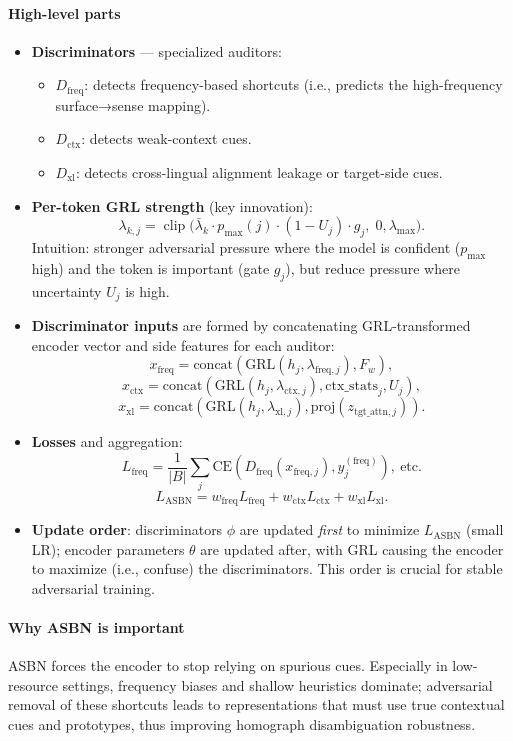 \documentclass[11pt]{article}
\begin{document}
\paragraph{High-level parts}
\begin{itemize}
  \item \textbf{Discriminators} — specialized auditors:
    \begin{itemize}
      \item $D_{\text{freq}}$: detects frequency-based shortcuts (i.e., predicts the high-frequency surface→sense mapping).
      \item $D_{\text{ctx}}$: detects weak-context cues.
      \item $D_{\text{xl}}$: detects cross-lingual alignment leakage or target-side cues.
    \end{itemize}
  \item \textbf{Per-token GRL strength} (key innovation):
    \[
    \lambda_{k,j}=\operatorname{clip}\big(\bar\lambda_k\cdot p_{\max}(j)\cdot(1-U_j)\cdot g_j,\;0,\lambda_{\max}\big).
    \]
    Intuition: stronger adversarial pressure where the model is confident ($p_{\max}$ high) and the token is important (gate $g_j$), but reduce pressure where uncertainty $U_j$ is high.
  \item \textbf{Discriminator inputs} are formed by concatenating GRL-transformed encoder vector and side features for each auditor:
    \[
    x_{\text{freq}}=\mathrm{concat}(\mathrm{GRL}(h_j,\lambda_{\text{freq},j}),F_w),
    \]
    \[
    x_{\text{ctx}}=\mathrm{concat}(\mathrm{GRL}(h_j,\lambda_{\text{ctx},j}),\text{ctx\_stats}_j,U_j),
    \]
    \[
    x_{\text{xl}}=\mathrm{concat}(\mathrm{GRL}(h_j,\lambda_{\text{xl},j}),\mathrm{proj}(z_{\text{tgt\_attn},j})).
    \]
  \item \textbf{Losses} and aggregation:
    \[
    L_{\text{freq}}=\frac{1}{|B|}\sum_j \mathrm{CE}(D_{\text{freq}}(x_{\text{freq},j}),y^{(\text{freq})}_j),\ \text{etc.}
    \]
    \[
    L_{\text{ASBN}}=w_{\text{freq}}L_{\text{freq}}+w_{\text{ctx}}L_{\text{ctx}}+w_{\text{xl}}L_{\text{xl}}.
    \]
  \item \textbf{Update order}: discriminators $\phi$ are updated \emph{first} to minimize $L_{\text{ASBN}}$ (small LR); encoder parameters $\theta$ are updated after, with GRL causing the encoder to maximize (i.e., confuse) the discriminators. This order is crucial for stable adversarial training.
\end{itemize}

\paragraph{Why ASBN is important}
ASBN forces the encoder to stop relying on spurious cues. Especially in low-resource settings, frequency biases and shallow heuristics dominate; adversarial removal of these shortcuts leads to representations that must use true contextual cues and prototypes, thus improving homograph disambiguation robustness.
\end{document}
